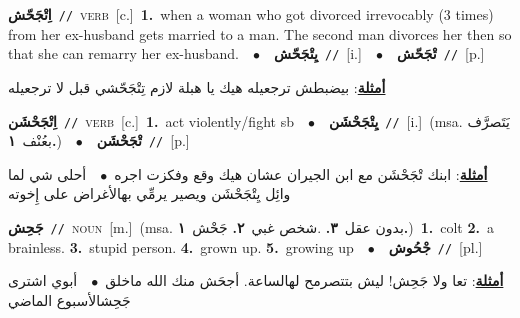 \documentclass[10pt,a4paper,twoside]{article} %
\begin{document}
\begin{multicols}{2}
{{{{{{{{{\setlength\topsep{0pt}\textbf{\foreignlanguage{arabic}{اِتْجَحّش}}\ {\color{gray}\texttt{//}\color{black}}\ \textsc{verb}\ [c.]\ \textbf{1.}~when a woman who got divorced irrevocably (3 times) from her ex-husband gets married to a man. The second man divorces her then so that she can remarry her ex-husband.\ \ $\bullet$\ \ \setlength\topsep{0pt}\textbf{\foreignlanguage{arabic}{يِتْجَحّش}}\ {\color{gray}\texttt{//}\color{black}}\ [i.]\ \ $\bullet$\ \ \setlength\topsep{0pt}\textbf{\foreignlanguage{arabic}{تْجَحّش}}\ {\color{gray}\texttt{//}\color{black}}\ [p.]\  \begin{flushright}\color{gray}\foreignlanguage{arabic}{\textbf{\underline{\foreignlanguage{arabic}{أمثلة}}}: بيضبطش ترجعيله هيك يا هبلة لازم تِتْجَحّشي قبل لا ترجعيله}\end{flushright}\color{black}} \vspace{2mm}

{\setlength\topsep{0pt}\textbf{\foreignlanguage{arabic}{اِتْجَحْشَن}}\ {\color{gray}\texttt{//}\color{black}}\ \textsc{verb}\ [c.]\ \textbf{1.}~act violently/fight sb\ \ $\bullet$\ \ \setlength\topsep{0pt}\textbf{\foreignlanguage{arabic}{يِتْجَحْشَن}}\ {\color{gray}\texttt{//}\color{black}}\ [i.]\ \color{gray}(msa. \foreignlanguage{arabic}{يَتَصرَّف بعُنْف}~\foreignlanguage{arabic}{\textbf{١.}})\color{black}\ \ $\bullet$\ \ \setlength\topsep{0pt}\textbf{\foreignlanguage{arabic}{تْجَحْشَن}}\ {\color{gray}\texttt{//}\color{black}}\ [p.]\  \begin{flushright}\color{gray}\foreignlanguage{arabic}{\textbf{\underline{\foreignlanguage{arabic}{أمثلة}}}: ابنك تْجَحْشَن مع ابن الجيران عشان هيك وقع وفكزت اجره\ $\bullet$\ \  أحلى شي لما وائِل يِتْجَحْشَن ويصير يرمِّي بهالأغراض على إِخوته}\end{flushright}\color{black}} \vspace{2mm}

{\setlength\topsep{0pt}\textbf{\foreignlanguage{arabic}{جَحِش}}\ {\color{gray}\texttt{//}\color{black}}\ \textsc{noun}\ [m.]\ \color{gray}(msa. \foreignlanguage{arabic}{بدون عقل}~\foreignlanguage{arabic}{\textbf{٣.}}  .\foreignlanguage{arabic}{شخص غبي}~\foreignlanguage{arabic}{\textbf{٢.}}  \foreignlanguage{arabic}{جَحْش}~\foreignlanguage{arabic}{\textbf{١.}})\color{black}\ \textbf{1.}~colt  \textbf{2.}~a brainless.  \textbf{3.}~stupid person.  \textbf{4.}~grown up.  \textbf{5.}~growing up\ \ $\bullet$\ \ \setlength\topsep{0pt}\textbf{\foreignlanguage{arabic}{جْحُوش}}\ {\color{gray}\texttt{//}\color{black}}\ [pl.]\  \begin{flushright}\color{gray}\foreignlanguage{arabic}{\textbf{\underline{\foreignlanguage{arabic}{أمثلة}}}: تعا ولا جَحِش! ليش بتتصرمح لهالساعة. أجحَش منك الله ماخلق\ $\bullet$\ \  أبوي اشترى جَحِشالأسبوع الماضي}\end{flushright}\color{black}} \vspace{2mm}

}}}}}}}}
\end{multicols}
\end{document}
